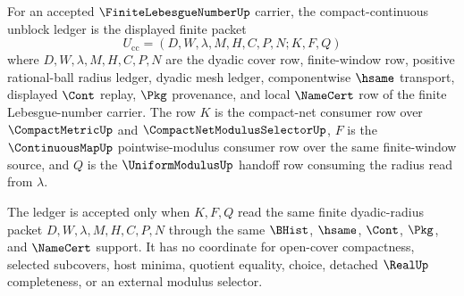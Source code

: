 \begin{definition}
\label{def:finite-lebesgue-number-compact-continuous-unblock-ledger}
For an accepted $\FiniteLebesgueNumberUp$ carrier, the compact-continuous unblock ledger is the displayed finite packet
$$
U_{\mathrm{cc}}=(D,W,\lambda,M,H,C,P,N;K,F,Q)
$$
where $D,W,\lambda,M,H,C,P,N$ are the dyadic cover row, finite-window row, positive rational-ball radius ledger, dyadic mesh ledger, componentwise $\hsame$ transport, displayed $\Cont$ replay, $\Pkg$ provenance, and local $\NameCert$ row of the finite Lebesgue-number carrier. The row $K$ is the compact-net consumer row over $\CompactMetricUp$ and $\CompactNetModulusSelectorUp$, $F$ is the $\ContinuousMapUp$ pointwise-modulus consumer row over the same finite-window source, and $Q$ is the $\UniformModulusUp$ handoff row consuming the radius read from $\lambda$.

The ledger is accepted only when $K,F,Q$ read the same finite dyadic-radius packet $D,W,\lambda,M,H,C,P,N$ through the same $\BHist$, $\hsame$, $\Cont$, $\Pkg$, and $\NameCert$ support. It has no coordinate for open-cover compactness, selected subcovers, host minima, quotient equality, choice, detached $\RealUp$ completeness, or an external modulus selector.
\end{definition}

